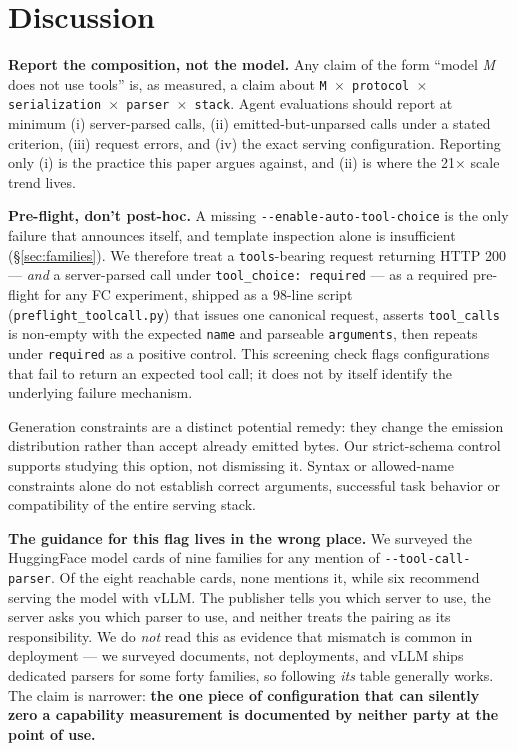 \section{Discussion}
\label{sec:discussion}

\textbf{Report the composition, not the model.} Any claim of the form ``model \emph{M} does not
use tools'' is, as measured, a claim about
\texttt{M $\times$ protocol $\times$ serialization $\times$ parser $\times$ stack}. Agent
evaluations should report at minimum (i) server-parsed calls, (ii) emitted-but-unparsed calls
under a stated criterion, (iii) request errors, and (iv) the exact serving configuration.
Reporting only (i) is the practice this paper argues against, and (ii) is where the 21$\times$
scale trend lives.

\textbf{Pre-flight, don't post-hoc.} A missing \texttt{-\/-enable-auto-tool-choice} is the only
failure that announces itself, and template inspection alone is insufficient
(\S\ref{sec:families}). We therefore treat a \texttt{tools}-bearing request returning HTTP 200 ---
\emph{and} a server-parsed call under \texttt{tool\_choice: required} --- as a required pre-flight
for any FC experiment, shipped as a 98-line script (\texttt{preflight\_toolcall.py}) that issues
one canonical request, asserts \texttt{tool\_calls} is non-empty with the expected \texttt{name}
and parseable \texttt{arguments}, then repeats under \texttt{required} as a positive control.
This screening check flags configurations that fail to return an expected tool call;
it does not by itself identify the underlying failure mechanism.

Generation constraints are a distinct potential remedy: they change the emission distribution
rather than accept already emitted bytes. Our strict-schema control supports studying this
option, not dismissing it. Syntax or allowed-name constraints alone do not establish correct
arguments, successful task behavior or compatibility of the entire serving stack.

\textbf{The guidance for this flag lives in the wrong place.} We surveyed the HuggingFace model
cards of nine families for any mention of \texttt{-\/-tool-call-parser}. Of the eight reachable
cards, none mentions it, while six recommend serving the model with vLLM. The publisher tells you
which server to use, the server asks you which parser to use, and neither treats the pairing as
its responsibility. We do \emph{not} read this as evidence that mismatch is common in deployment
--- we surveyed documents, not deployments, and vLLM ships dedicated parsers for some forty
families, so following \emph{its} table generally works. The claim is narrower: \textbf{the one
piece of configuration that can silently zero a capability measurement is documented by neither
party at the point of use.}

